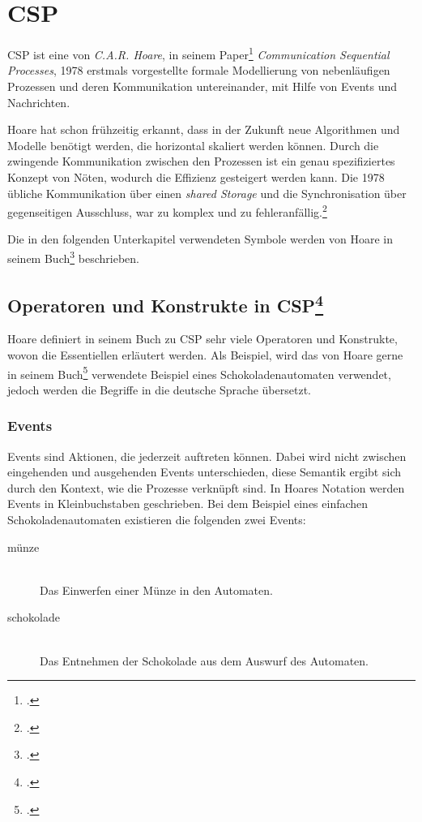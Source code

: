 \section{\acl{CSP}}
\acf{CSP} ist eine von \textit{C.A.R. Hoare}, in seinem Paper\footcite{CSP} \textit{Communication Sequential Processes}, 1978 erstmals vorgestellte formale Modellierung von nebenläufigen Prozessen und deren Kommunikation untereinander, mit Hilfe von Events und Nachrichten.

Hoare hat schon frühzeitig erkannt, dass in der Zukunft neue Algorithmen und Modelle benötigt werden, die horizontal skaliert werden können. Durch die zwingende Kommunikation zwischen den Prozessen ist ein genau spezifiziertes Konzept von Nöten, wodurch die Effizienz gesteigert werden kann. Die 1978 übliche Kommunikation über einen \textit{shared Storage} und die Synchronisation über gegenseitigen Ausschluss, war zu komplex und zu fehleranfällig.\footcite[Introduction]{CSP}

Die in den folgenden Unterkapitel verwendeten Symbole werden von Hoare in seinem Buch\footcite[Glossary of Symbols]{CSPBOOK} beschrieben.

\subsection[Operatoren und Konstrukte in \acs{CSP}]{Operatoren und Konstrukte in \acs{CSP}\footcite[Siehe][Kap. 1.1]{CSPBOOK}}

Hoare definiert in seinem Buch zu \ac{CSP} sehr viele Operatoren und Konstrukte, wovon die Essentiellen  erläutert werden. Als Beispiel, wird das von Hoare gerne in seinem Buch\footcite{CSPBOOK} verwendete Beispiel eines Schokoladenautomaten verwendet, jedoch werden die Begriffe in die deutsche Sprache übersetzt.

\subsubsection{Events}
Events sind Aktionen, die jederzeit auftreten können. Dabei wird nicht zwischen eingehenden und ausgehenden Events unterschieden, diese Semantik ergibt sich durch den Kontext, wie die Prozesse verknüpft sind. In Hoares Notation werden Events in Kleinbuchstaben geschrieben.
Bei dem Beispiel eines einfachen Schokoladenautomaten existieren die folgenden zwei Events:

\begin{description}
\item[münze]\hfill \\
Das Einwerfen einer Münze in den Automaten.
\item[schokolade]\hfill \\
Das Entnehmen der Schokolade aus dem Auswurf des Automaten.
\end{description}

